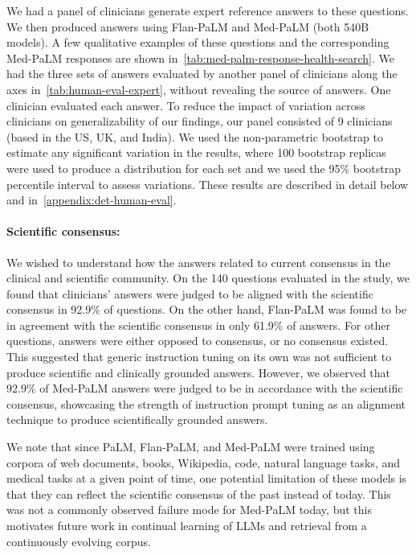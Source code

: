 \documentclass[10pt, letter, onecolumn]{arxiv}
\begin{document}
\begin{refsection}
We had a panel of clinicians generate expert reference answers to these questions. We then produced answers using Flan-PaLM and Med-PaLM (both 540B models). A few qualitative examples of these questions and the corresponding Med-PaLM responses are shown in~\cref{tab:med-palm-response-health-search}. We had the three sets of answers evaluated by another panel of clinicians along the axes in~\cref{tab:human-eval-expert}, without revealing the source of answers. One clinician evaluated each answer. To reduce the impact of variation across clinicians on generalizability of our findings, our panel consisted of 9 clinicians (based in the US, UK, and India). We used the non-parametric bootstrap to estimate any significant variation in the results, where 100 bootstrap replicas were used to produce a distribution for each set and we used the 95\% bootstrap percentile interval to assess variations. These results are described in detail below and in~\cref{appendix:det-human-eval}.

\paragraph{Scientific consensus:}

We wished to understand how the answers related to current consensus in the clinical and scientific community. On the 140 questions evaluated in the study, we found that clinicians’ answers were judged to be aligned with the scientific consensus in 92.9\% of questions. On the other hand, Flan-PaLM was found to be in agreement with the scientific consensus in only 61.9\% of answers. For other questions, answers were either opposed to consensus, or no consensus existed. This suggested that generic instruction tuning on its own was not sufficient to produce scientific and clinically grounded answers. However, we observed that 92.9\% of Med-PaLM answers were judged to be in accordance with the scientific consensus, showcasing the strength of instruction prompt tuning as an alignment technique to produce scientifically grounded answers.

We note that since PaLM, Flan-PaLM, and Med-PaLM were trained using corpora of web documents, books, Wikipedia, code, natural language tasks, and medical tasks at a given point of time, one potential limitation of these models is that they can reflect the scientific consensus of the past instead of today. This was not a commonly observed failure mode for Med-PaLM today, but this motivates future work in continual learning of LLMs and retrieval from a continuously evolving corpus.



\end{refsection}
\end{document}
